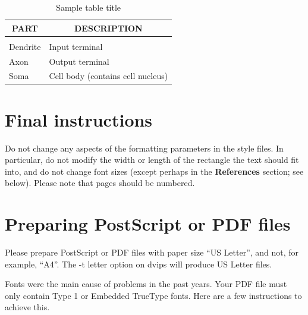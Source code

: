 \documentclass{article} %
\begin{document}
\begin{table}[t]
\caption{Sample table title}
\label{sample-table}
\begin{center}
\begin{tabular}{ll}
\multicolumn{1}{c}{\bf PART}  &\multicolumn{1}{c}{\bf DESCRIPTION}
\\ \hline \\
Dendrite         &Input terminal \\
Axon             &Output terminal \\
Soma             &Cell body (contains cell nucleus) \\
\end{tabular}
\end{center}
\end{table}

\section{Final instructions}
Do not change any aspects of the formatting parameters in the style files.
In particular, do not modify the width or length of the rectangle the text
should fit into, and do not change font sizes (except perhaps in the
\textbf{References} section; see below). Please note that pages should be
numbered.

\section{Preparing PostScript or PDF files}

Please prepare PostScript or PDF files with paper size ``US Letter'', and
not, for example, ``A4''. The -t
letter option on dvips will produce US Letter files.

Fonts were the main cause of problems in the past years. Your PDF file must
only contain Type 1 or Embedded TrueType fonts. Here are a few instructions
to achieve this.
\end{document}

